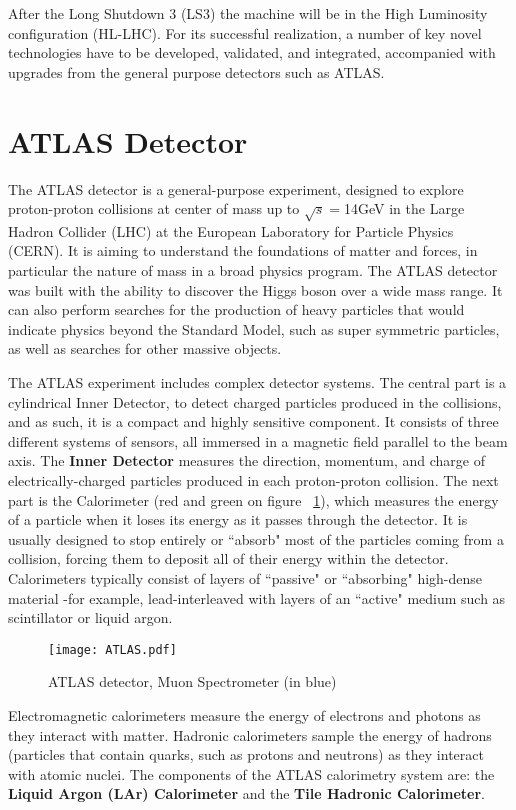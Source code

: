 After the Long Shutdown 3 (LS3) the machine will be in the High Luminosity configuration (HL-LHC). For its successful
realization, a number of key novel technologies have to be developed, validated, and integrated, accompanied with
upgrades from the
general purpose detectors such as ATLAS.


\section{ATLAS Detector}

The ATLAS detector is a general-purpose experiment, designed to explore proton-proton collisions at center of mass up to
$\sqrt{s}=$14GeV in the Large Hadron Collider (LHC) at the European Laboratory for Particle Physics (CERN). It is aiming
to understand the foundations of matter and forces, in particular the nature of mass in a broad physics program. The
ATLAS detector was built with the ability to discover the Higgs boson over a wide mass range. It can also perform
searches for the production of heavy particles that would indicate physics beyond the Standard Model, such as super
symmetric particles, as well as searches for other massive objects. \par 

The ATLAS experiment includes complex detector systems. The central part is a cylindrical Inner Detector, to detect
charged particles produced in the collisions, and as such, it is a compact and highly sensitive component. It consists of
three different systems of sensors, all immersed in a magnetic field parallel to the beam axis. The {\bf Inner Detector}
measures the direction, momentum, and charge of electrically-charged particles produced in each proton-proton collision.
The next part is the Calorimeter (red and green on figure ~\ref{fig:ATLAS}), which  measures the energy of a particle
when it loses its energy as it passes through the detector. It is usually designed to stop entirely or ``absorb" most of
the particles coming from a collision, forcing them to deposit all of their energy within the detector. Calorimeters
typically consist of layers of ``passive" or ``absorbing" high-dense material -for example, lead-interleaved with layers
of an ``active" medium such as scintillator or liquid argon.\par
\begin{figure}[H]
		\centering
		\texttt{[image: ATLAS.pdf]}
		\caption{ATLAS detector, Muon Spectrometer (in blue)}\label{fig:ATLAS}
\end{figure}
Electromagnetic calorimeters measure the energy of electrons and photons as they interact with matter. Hadronic
calorimeters sample the energy of hadrons (particles that contain quarks, such as protons and neutrons) as they interact
with atomic nuclei. The components of the ATLAS calorimetry system are: the {\bf Liquid Argon (LAr) Calorimeter} and the
{\bf Tile Hadronic Calorimeter}.\par

